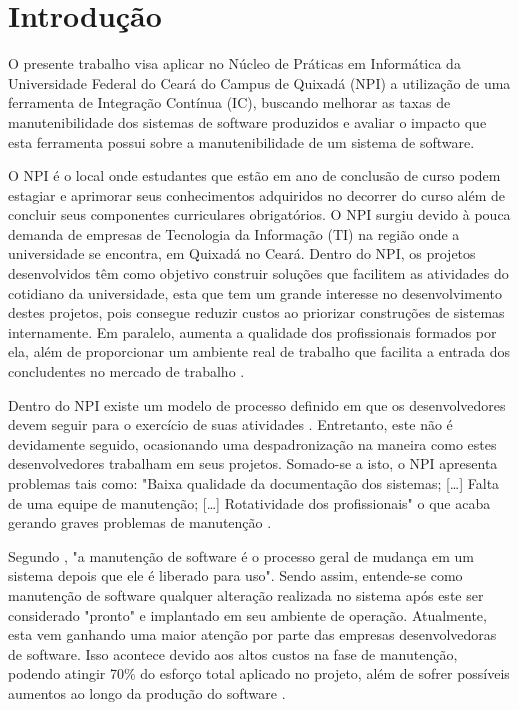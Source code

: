 \chapter{Introdução}

O presente trabalho visa aplicar no Núcleo de Práticas em Informática da Universidade Federal do Ceará do Campus de Quixadá (NPI) a utilização de uma ferramenta de Integração Contínua (IC), buscando melhorar as taxas de manutenibilidade dos sistemas de software produzidos e avaliar o impacto que esta ferramenta possui sobre a manutenibilidade de um sistema de software.

O NPI é o local onde estudantes que estão em ano de conclusão de curso podem estagiar e aprimorar seus conhecimentos adquiridos no decorrer do curso além de concluir seus componentes curriculares obrigatórios. O NPI surgiu devido à pouca demanda de empresas de Tecnologia da Informação (TI) na região onde a universidade se encontra, em Quixadá no Ceará. Dentro do NPI, os projetos desenvolvidos têm como objetivo construir soluções que facilitem as atividades do cotidiano da universidade, esta que tem um grande interesse no desenvolvimento destes projetos, pois consegue reduzir custos ao priorizar construções de sistemas internamente. Em paralelo, aumenta a qualidade dos profissionais formados por ela, além de proporcionar um ambiente real de trabalho que facilita a entrada dos concludentes no mercado de trabalho \cite{npi2013}.

Dentro do NPI existe um modelo de processo definido em que os desenvolvedores devem seguir para o exercício de suas atividades \cite{npi2013}. Entretanto, este não é devidamente seguido, ocasionando uma despadronização na maneira como estes  desenvolvedores trabalham em seus projetos. Somado-se a isto, o NPI apresenta problemas tais como: "Baixa qualidade da documentação dos sistemas; [\ldots] Falta de uma equipe de manutenção; [\ldots] Rotatividade dos profissionais" o que acaba gerando graves problemas de manutenção \cite[p.~4]{paduelli2006}.


Segundo , "a manutenção de software é o processo geral de mudança em um sistema depois que ele é liberado para uso". Sendo assim, entende-se como manutenção de software  qualquer alteração realizada no sistema após este ser considerado "pronto" e implantado em seu ambiente de operação. Atualmente, esta vem ganhando uma maior atenção por parte das empresas desenvolvedoras de software. Isso acontece devido aos altos custos na fase de manutenção, podendo atingir 70\% do esforço total aplicado no projeto, além de sofrer possíveis aumentos ao longo da produção do software \cite{pressman2010}.

